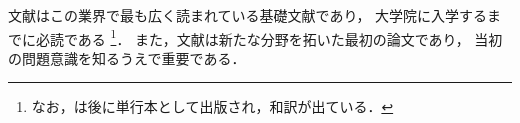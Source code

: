 \documentclass[lualatex,ja=standard,magstyle=real,12pt]{bxjsarticle}
\begin{document}
文献\autocite{hoge2000,foobar1990}はこの業界で最も広く読まれている基礎文献であり，
大学院に入学するまでに必読である
\footnote{なお，\cite{foobar1990}は後に単行本として出版され，和訳が出ている\cite{foobar1995}．}．
また，文献\autocite{hoge2001}は新たな分野を拓いた最初の論文であり，
当初の問題意識を知るうえで重要である．
\printbibliography
\end{document}
